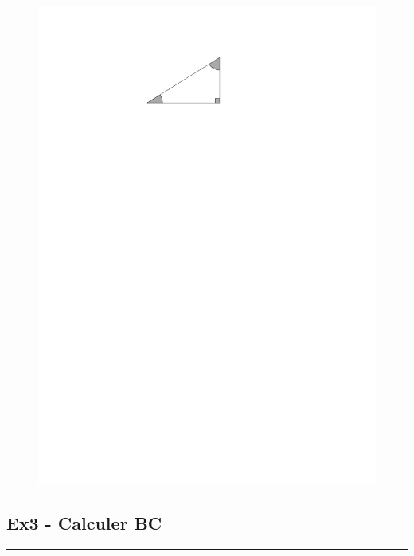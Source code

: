 \documentclass[12pt]{article}
\newcommand{\horrule}[1]{\rule{\linewidth}{#1}} %
\newcommand{\Pointille}[1][3]{\multido{}{#1}{ \makebox[\linewidth]{\dotfill}\\[\parskip]}}
\begin{document}
\begin{multicols}{2}

  \begin{figure}[H]
    \centering
    \includegraphics[width=0.6\linewidth]{sources/2/exo3.pdf}
  \end{figure}
  
  \subsection*{Ex3 - Calculer BC}

  \Pointille[6]

\end{multicols}

\horrule{0.5pt}
\end{document}

